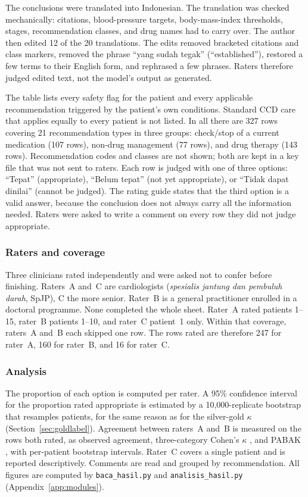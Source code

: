 The conclusions were translated into Indonesian. The translation was checked mechanically:
citations, blood-pressure targets, body-mass-index thresholds, stages, recommendation classes,
and drug names had to carry over. The author then edited 12 of the 20 translations. The edits
removed bracketed citations and class markers, removed the phrase ``yang sudah tegak''
(``established''), restored a few terms to their English form, and rephrased a few phrases.
Raters therefore judged edited text, not the model's output as generated.

The table lists every safety flag for the patient and every applicable recommendation
triggered by the patient's own conditions. Standard CCD care that applies equally to every
patient is not listed. In all there are 327 rows covering 21 recommendation types in three
groups: check/stop of a current medication (107 rows), non-drug management (77 rows), and
drug therapy (143 rows). Recommendation codes and classes are not shown; both are kept in a
key file that was not sent to raters. Each row is judged with one of three options:
``Tepat'' (appropriate), ``Belum tepat'' (not yet appropriate), or ``Tidak dapat dinilai''
(cannot be judged). The rating guide states that the third option is a valid answer, because
the conclusion does not always carry all the information needed. Raters were asked to write
a comment on every row they did not judge appropriate.

\subsubsection*{Raters and coverage}
Three clinicians rated independently and were asked not to confer before finishing. Raters~A and~C are
cardiologists (\emph{spesialis jantung dan pembuluh darah}, SpJP), C the more senior. Rater~B
is a general practitioner enrolled in a doctoral programme. None completed the whole sheet.
Rater~A rated patients 1--15, rater~B patients 1--10, and rater~C patient~1 only. Within
that coverage, raters~A and~B each skipped one row. The rows rated are therefore 247 for
rater~A, 160 for rater~B, and 16 for rater~C.

\subsubsection*{Analysis}
The proportion of each option is computed per rater. A 95\% confidence interval for the
proportion rated appropriate is estimated by a 10{,}000-replicate bootstrap that resamples
patients, for the same reason as for the silver-gold $\kappa$
(Section~\ref{sec:goldlabel}). Agreement between raters~A and~B is measured on the rows both
rated, as observed agreement, three-category Cohen's $\kappa$ \cite{cohen1960}, and PABAK
\cite{byrt1993}, with per-patient bootstrap intervals. Rater~C covers a single patient and is
reported descriptively. Comments are read and grouped by recommendation. All figures are
computed by \texttt{baca\_hasil.py} and \texttt{analisis\_hasil.py}
(Appendix~\ref{app:modules}).

